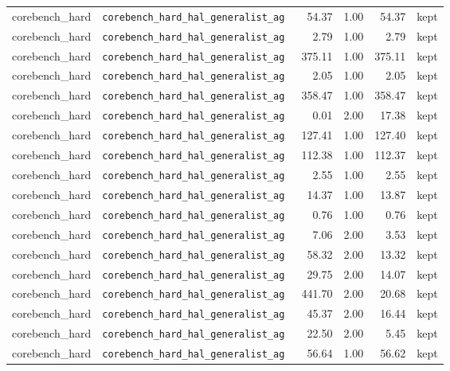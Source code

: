{\begin{longtable}{llrrrl}
corebench\_hard & \texttt{\scriptsize corebench\_hard\_hal\_generalist\_ag~} & 54.37 & 1.00 & 54.37 & kept \\
corebench\_hard & \texttt{\scriptsize corebench\_hard\_hal\_generalist\_ag~} & 2.79 & 1.00 & 2.79 & kept \\
corebench\_hard & \texttt{\scriptsize corebench\_hard\_hal\_generalist\_ag~} & 375.11 & 1.00 & 375.11 & kept \\
corebench\_hard & \texttt{\scriptsize corebench\_hard\_hal\_generalist\_ag~} & 2.05 & 1.00 & 2.05 & kept \\
corebench\_hard & \texttt{\scriptsize corebench\_hard\_hal\_generalist\_ag~} & 358.47 & 1.00 & 358.47 & kept \\
corebench\_hard & \texttt{\scriptsize corebench\_hard\_hal\_generalist\_ag~} & 0.01 & 2.00 & 17.38 & kept \\
corebench\_hard & \texttt{\scriptsize corebench\_hard\_hal\_generalist\_ag~} & 127.41 & 1.00 & 127.40 & kept \\
corebench\_hard & \texttt{\scriptsize corebench\_hard\_hal\_generalist\_ag~} & 112.38 & 1.00 & 112.37 & kept \\
corebench\_hard & \texttt{\scriptsize corebench\_hard\_hal\_generalist\_ag~} & 2.55 & 1.00 & 2.55 & kept \\
corebench\_hard & \texttt{\scriptsize corebench\_hard\_hal\_generalist\_ag~} & 14.37 & 1.00 & 13.87 & kept \\
corebench\_hard & \texttt{\scriptsize corebench\_hard\_hal\_generalist\_ag~} & 0.76 & 1.00 & 0.76 & kept \\
corebench\_hard & \texttt{\scriptsize corebench\_hard\_hal\_generalist\_ag~} & 7.06 & 2.00 & 3.53 & kept \\
corebench\_hard & \texttt{\scriptsize corebench\_hard\_hal\_generalist\_ag~} & 58.32 & 2.00 & 13.32 & kept \\
corebench\_hard & \texttt{\scriptsize corebench\_hard\_hal\_generalist\_ag~} & 29.75 & 2.00 & 14.07 & kept \\
corebench\_hard & \texttt{\scriptsize corebench\_hard\_hal\_generalist\_ag~} & 441.70 & 2.00 & 20.68 & kept \\
corebench\_hard & \texttt{\scriptsize corebench\_hard\_hal\_generalist\_ag~} & 45.37 & 2.00 & 16.44 & kept \\
corebench\_hard & \texttt{\scriptsize corebench\_hard\_hal\_generalist\_ag~} & 22.50 & 2.00 & 5.45 & kept \\
corebench\_hard & \texttt{\scriptsize corebench\_hard\_hal\_generalist\_ag~} & 56.64 & 1.00 & 56.62 & kept \\

\end{longtable}}
